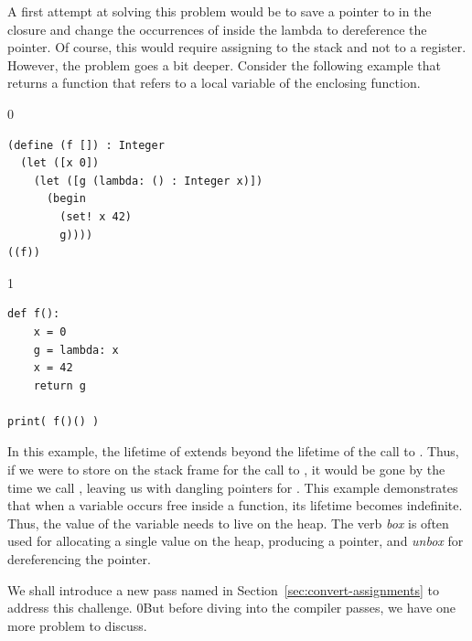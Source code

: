 \documentclass[7x10,nocrop]{TimesAPriori_MIT}%
\def\racketEd{0}
\def\pythonEd{1}
\def\edition{0}
\newcommand{\racket}[1]{{\if\edition\racketEd{#1}\fi}}
\begin{document}
A first attempt at solving this problem would be to save a pointer to
 in the closure and change the occurrences of  inside
the lambda to dereference the pointer. Of course, this would require
assigning  to the stack and not to a register. However, the
problem goes a bit deeper.
Consider the following example that returns a function that refers to
a local variable of the enclosing function.
\begin{center}
\begin{minipage}{\textwidth}
{\if\edition\racketEd

\begin{lstlisting}
(define (f []) : Integer
  (let ([x 0])
    (let ([g (lambda: () : Integer x)])
      (begin
        (set! x 42)
        g))))
((f))
\end{lstlisting}
\fi}
{\if\edition\pythonEd
\begin{lstlisting}
def f():
    x = 0
    g = lambda: x
    x = 42
    return g

print( f()() )
\end{lstlisting}
\fi}
\end{minipage}
\end{center}
In this example, the lifetime of  extends beyond the lifetime
of the call to . Thus, if we were to store  on the
stack frame for the call to , it would be gone by the time we
call , leaving us with dangling pointers for
. This example demonstrates that when a variable occurs free
inside a function, its lifetime becomes indefinite. Thus, the value of
the variable needs to live on the heap.  The verb
\emph{box} is often used for allocating a single
value on the heap, producing a pointer, and
\emph{unbox} for dereferencing the pointer.

We shall introduce a new pass named
 in Section~\ref{sec:convert-assignments}
to address this challenge.
%
\racket{But before diving into the compiler passes, we have one more
  problem to discuss.}
\end{document}
